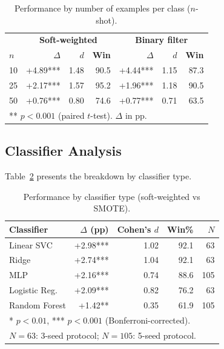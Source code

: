 \documentclass[conference]{IEEEtran}
\begin{document}
\begin{table}[t]
\centering
\caption{Performance by number of examples per class ($n$-shot).}
\label{tab:nshot}
\scriptsize
\setlength{\tabcolsep}{3pt}
\begin{tabular}{lrrr|rrr}
\toprule
 & \multicolumn{3}{c|}{\textbf{Soft-weighted}} & \multicolumn{3}{c}{\textbf{Binary filter}} \\
\textbf{$n$} & \textbf{$\Delta$} & \textbf{$d$} & \textbf{Win} & \textbf{$\Delta$} & \textbf{$d$} & \textbf{Win} \\
\midrule
10 & +4.89*** & 1.48 & 90.5 & +4.44*** & 1.15 & 87.3 \\
25 & +2.17*** & 1.57 & 95.2 & +1.96*** & 1.18 & 90.5 \\
50 & +0.76*** & 0.80 & 74.6 & +0.77*** & 0.71 & 63.5 \\
\bottomrule
\multicolumn{7}{l}{\scriptsize *** $p\!<\!0.001$ (paired $t$-test). $\Delta$ in pp.}
\end{tabular}
\end{table}

\subsection{Classifier Analysis}

Table~\ref{tab:classifiers} presents the breakdown by classifier type.

\begin{table}[t]
\centering
\caption{Performance by classifier type (soft-weighted vs SMOTE).}
\label{tab:classifiers}
\small
\begin{tabular}{lrrrr}
\toprule
\textbf{Classifier} & \textbf{$\Delta$ (pp)} & \textbf{Cohen's $d$} & \textbf{Win\%} & \textbf{$N$} \\
\midrule
Linear SVC   & +2.98*** & 1.02 & 92.1 & 63 \\
Ridge        & +2.74*** & 1.04 & 92.1 & 63 \\
MLP          & +2.16*** & 0.74 & 88.6 & 105 \\
Logistic Reg.& +2.09*** & 0.82 & 76.2 & 63 \\
Random Forest& +1.42**  & 0.35 & 61.9 & 105 \\
\bottomrule
\multicolumn{5}{l}{\footnotesize ** $p<0.01$, *** $p<0.001$ (Bonferroni-corrected).} \\
\multicolumn{5}{l}{\footnotesize $N\!=\!63$: 3-seed protocol; $N\!=\!105$: 5-seed protocol.}
\end{tabular}
\end{table}
\end{document}
